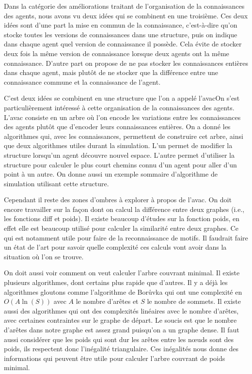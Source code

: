 \documentclass[a4paper]{article}
\begin{document}
Dans la catégorie des améliorations traitant de l'organisation de la
connaissances des agents, nous avons vu deux idées qui se combinent en une
troisième. Ces deux idées sont d'une part la mise en commun de la connaissance,
c'est-à-dire qu'on stocke toutes les versions de connaissances dans une
structure, puis on indique dans chaque agent quel version de connaissance il
possède. Cela évite de stocker deux fois la même version de connaissance lorsque
deux agents ont la même connaissance. D'autre part on propose de ne pas stocker
les connaissances entières dans chaque agent, mais plutôt de ne stocker que la
différence entre une connaissance commune et la connaissance de l'agent.

C'est deux idées se combinent en une structure que l'on a appelé l'\gls{avac}On
s'est particulièrement intéressé à cette organisation de la connaissances des
agents. L'\gls{avac} consiste en un arbre où l'on encode les variations entre
les connaissances des agents plutôt que d'encoder leurs connaissances entières.
On a donné les algorithmes qui, avec les connaissances, permettent de construire
cet arbre, ainsi que deux algorithmes utiles durant la simulation. L'un permet
de modifier la structure lorsqu'un agent découvre nouvel espace. L'autre permet
d'utiliser la structure pour calculer le plus court chemins connu d'un agent
pour aller d'un point à un autre. On donne aussi un exemple sommaire
d'algorithme de simulation utilisant cette structure.

Cependant il reste des zones d'ombres à explorer à propos de l'\gls{avac}. On
doit encore travailler sur la façon dont on calcul la différence entre deux
graphes (i.e., les fonctions \gls{diff} et \gls{poids}). Il existe beaucoup
d'études sur la fonction \gls{poids}, en effet elle est beaucoup utilisé pour
calculer la similarité entre deux graphes. Ce qui est notamment utile pour faire
de la reconnaissance de motifs. Il faudrait faire un état de l'art pour savoir
quelle complexité ces calculs vont avoir dans la situation où l'on se
trouve.

On doit aussi voir comment on veut calculer l'arbre couvrant minimal. Il existe
plusieurs algorithmes, dont certains plus rapide que d'autres. Il y a déjà les
algorithmes gloutons comme l'algorithme de Borůvka qui ont une complexité en
$O(A\ln(S))$ avec $A$ le nombre d'arêtes et $S$ le nombre de sommets. Il existe
aussi des algorithmes qui ont des complexités linéaires avec le nombre d'arêtes,
avec certaines contraintes sur le graphe de départ. Le soucis est que le nombre
d'arêtes dans notre graphe est assez grand puisqu'on a un graphe dense. Il faut
aussi considérer que les poids qui sont dur les arêtes entre les nœuds sont des
poids, ils respectent donc l'inégalité triangulaire. Ces inégalités nous donne
des informations qui peuvent être utile pour calculer l'arbre couvrant de poids
minimal.
\end{document}
